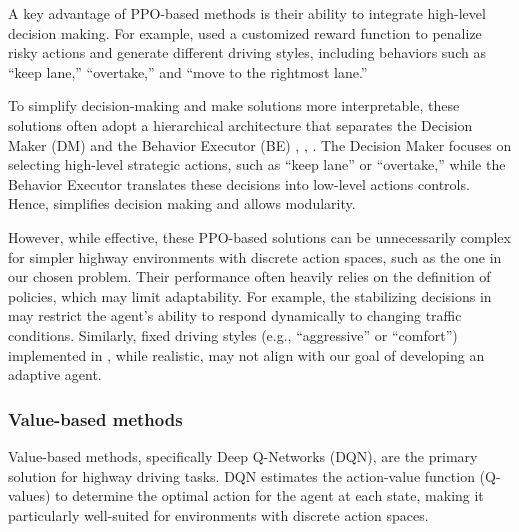 \documentclass{article}
\begin{document}
A key advantage of PPO-based methods is their ability to integrate high-level decision making. For example, \citep{forneris_implementing_2023} used a customized reward function to penalize risky actions and generate different driving styles, including behaviors such as “keep lane,” “overtake,” and “move to the rightmost lane.” 

To simplify decision-making and make solutions more interpretable, these solutions often adopt a hierarchical architecture that separates the Decision Maker (DM) and the Behavior Executor (BE) \citep{pighetti_high-level_2022}, \citep{forneris_implementing_2023}, \citep{capello_investigating_2023}.
The Decision Maker focuses on selecting high-level strategic actions, such as “keep lane” or “overtake,” while the Behavior Executor translates these decisions into low-level actions controls. Hence, simplifies decision making and allows modularity.

However, while effective, these PPO-based solutions can be unnecessarily complex for simpler highway environments with discrete action spaces, such as the one in our chosen problem. Their performance often heavily relies on the definition of policies, which may limit adaptability. For example, the stabilizing decisions in \citep{pighetti_high-level_2022} may restrict the agent's ability to respond dynamically to changing traffic conditions. Similarly, fixed driving styles (e.g., “aggressive” or “comfort”) implemented in \citep{forneris_implementing_2023}, while realistic, may not align with our goal of developing an adaptive agent.



\subsubsection{Value-based methods}

Value-based methods, specifically Deep Q-Networks (DQN), are the primary solution for highway driving tasks. 
DQN estimates the action-value function (Q-values) to determine the optimal action for the agent at each state, making it particularly well-suited for environments with discrete action spaces.
\end{document}
